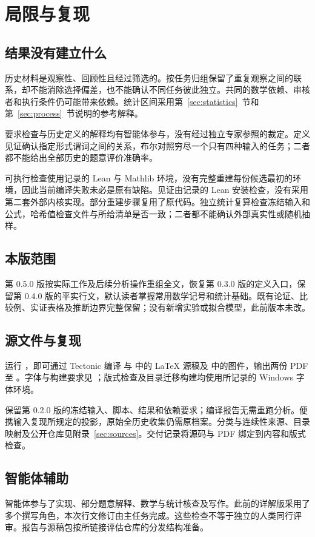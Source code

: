 \section{局限与复现}
\label{sec:limitations}
\subsection{结果没有建立什么}
历史材料是观察性、回顾性且经过筛选的。按任务归组保留了重复观察之间的联系，却不能消除选择偏差，也不能确认不同任务彼此独立。共同的数学依赖、审核者和执行条件仍可能带来依赖。统计区间采用第~\ref{sec:statistics}~节和第~\ref{sec:process}~节说明的参考解释。

要求检查与历史定义的解释均有智能体参与，没有经过独立专家参照的裁定。定义见证确认指定形式谓词之间的关系，布尔对照穷尽一个只有四种输入的任务；二者都不能给出全部历史的题意评价准确率。

可执行检查使用记录的 Lean 与 Mathlib 环境，没有完整重建每份候选最初的环境，因此当前编译失败未必是原有缺陷。见证由记录的 Lean 安装检查，没有采用第二套外部内核实现。部分重建步骤复用了原代码。独立统计复算检查冻结输入和公式，哈希值检查文件与所给清单是否一致；二者都不能确认外部真实性或随机抽样。

\subsection{本版范围}
第 0.5.0 版按实际工作及后续分析操作重组全文，恢复第 0.3.0 版的定义入口，保留第 0.4.0 版的平实行文，默认读者掌握常用数学记号和统计基础。既有论证、比较例、实证表格及推断边界完整保留；没有新增实验或拟合模型，此前版本未改。

\subsection{源文件与复现}
运行 ，即可通过 Tectonic 编译  与  中的 LaTeX 源稿及  中的图件，输出两份 PDF 至 。字体与构建要求见 ；版式检查及目录迁移构建均使用所记录的 Windows 字体环境。

 保留第 0.2.0 版的冻结输入、脚本、结果和依赖要求；编译报告无需重跑分析。便携输入复现所规定的投影，原始全历史收集仍需原档案。分类与连续性来源、目录映射及公开仓库见附录~\ref{sec:sources}。交付记录将源码与 PDF 绑定到内容和版式检查。

\subsection{智能体辅助}
智能体参与了实现、部分题意解释、数学与统计核查及写作。此前的详解版采用了多个撰写角色，本次行文修订由主任务完成。这些检查不等于独立的人类同行评审。报告与源稿包按所链接评估仓库的分发结构准备。
